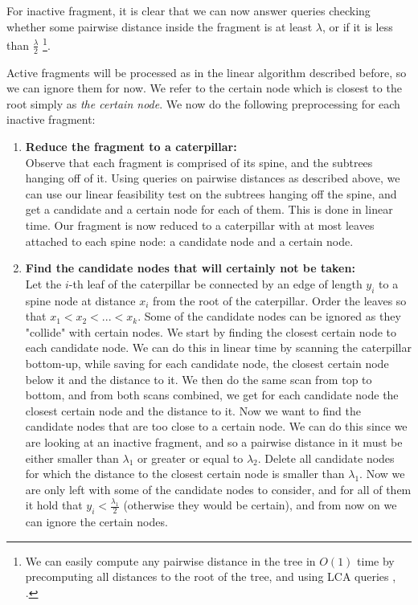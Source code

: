 \documentclass[11pt,a4paper]{article}
\theoremstyle{definition}
\theoremstyle{remark}
\begin{document}
For inactive fragment, it is clear that we can now answer queries checking whether some pairwise distance inside the fragment is at least $\lambda$, or if it is less than $\frac{\lambda}{2}$ \footnote{We can easily compute any pairwise distance in the tree in $O(1)$ time by precomputing all distances to the root of the tree, and using LCA queries \cite{Bender2000}, \cite{Djidjev1991}.}.

Active fragments will be processed as in the linear algorithm described before, so we can ignore them for now. We refer to the certain node which is closest to the root simply as \textit{the certain node}. We now do the following preprocessing for each inactive fragment:
\begin{enumerate}
\item\textbf{Reduce the fragment to a caterpillar:}\\
Observe that each fragment is comprised of its spine, and the subtrees hanging off of it. Using queries on pairwise distances as described above, we can use our linear feasibility test on the subtrees hanging off the spine, and get a candidate and a certain node for each of them. This is done in linear time.
Our fragment is now reduced to a caterpillar with at most leaves attached to each spine node: a candidate
node and a certain node.
\item\label{removing certain nodes}
\textbf{Find the candidate nodes that will certainly not be taken:}\\ %
Let the $i$-th leaf of the caterpillar be connected by an edge of length $y_i$ to a spine node at distance $x_i$ from the root of the caterpillar. Order the leaves so that $x_1 < x_2 < ... < x_k$.
Some of the candidate nodes can be ignored as they "collide" with certain nodes. We start by finding the closest certain node to each candidate node. We can do this in linear time by scanning the caterpillar bottom-up, while saving for each candidate node, the closest certain node below it and the distance to it. We then do the same scan from top to bottom, and from both scans combined, we get for each candidate node the closest certain node and the distance to it. Now we want to find the candidate nodes that are too close to a certain node. We can do this since we are looking at an inactive fragment, and so a pairwise distance in it must be either smaller than $\lambda_1$ or greater or equal to $\lambda_2$. Delete all candidate nodes for which the distance to the closest certain node is smaller than $\lambda_1$. 
Now we are only left with some of the candidate nodes to consider, and for all of them it hold that $y_i < \frac{\lambda_1}{2}$ (otherwise they would be certain), and from now on we can ignore the certain nodes.

\end{enumerate}
\end{document}
